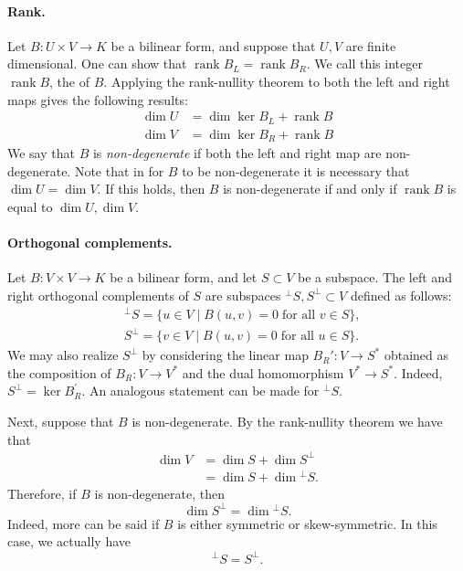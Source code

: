 \documentclass[12pt]{article}
\newcommand{\rank}{\operatorname{rank}}
\begin{document}
\paragraph{Rank.}
Let $B:U\times V\to K$ be a bilinear form, and suppose that $U,V$ are
finite dimensional. One can show that $\rank B_L = \rank B_R$. We call
this integer $\rank B$, the \emph{} of $B$.
Applying the rank-nullity theorem to both the left and right maps
gives the following results:
\begin{align*}
  \dim U &= \dim \ker {B_L} + \rank B\\
  \dim V &= \dim \ker {B_R} + \rank B
\end{align*}
We say that $B$ is
\emph{non-degenerate} if both the left and right map are
non-degenerate.  Note that in  for $B$ to be non-degenerate it is
necessary that $\dim U = \dim V$.  If this holds, then $B$ is
non-degenerate if and only if $\rank B$ is equal to $\dim U, \dim V$.

\paragraph{Orthogonal complements.}
Let $B:V\times V\to K$ be a bilinear form, and let $S \subset V$ be a
subspace.  The left and right orthogonal complements of $S$ are
subspaces ${^\perp}S, S^\perp \subset V$ defined as follows:
\begin{align*}
&{}^\perp S =  \{ u\in V \mid B(u,v) = 0 \; \text{for all } v \in S \},\\
&S^\perp = \{ v\in V \mid B(u,v) = 0 \; \text{for all } u \in S \} .
\end{align*}
We may also realize $S^\perp$ by considering the linear map $B_{R}':
V\to S^*$ obtained as the composition of  $B_R: 
V\to V^*$ and the dual homomorphism $V^*\to S^*$.
Indeed, $S^\perp = \ker B^\prime_R$. An analogous
statement can be made for ${}^\perp S$.  

Next, suppose that $B$ is non-degenerate.
By the rank-nullity
theorem  we have that
\begin{align*}
  \dim V &= \dim S + \dim  S^\perp\\
  &= \dim S + \dim {}^\perp S.   
\end{align*}
Therefore, if $B$ is non-degenerate, then 
\[\dim  S^\perp = \dim {}^\perp S. \]
Indeed, more can be said if $B$ is either symmetric or 
skew-symmetric.  In this case, we actually have
\[{}^\perp S = S^\perp.\]
\end{document}
